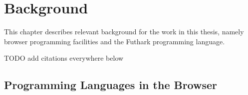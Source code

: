 \documentclass[11pt]{book}
\begin{document}
\chapter{Background}

This chapter describes relevant background for the work in this thesis, namely browser programming facilities and the Futhark programming language.

TODO add citations everywhere below





\section{Programming Languages in the Browser}








\end{document}
